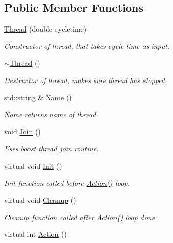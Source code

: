 \subsection*{Public Member Functions}
\begin{DoxyCompactItemize}
\item 
\hyperlink{classRCS_1_1Thread_a3f5e86f11c0b8fc3aa4728549b1b7249}{Thread} (double cycletime)
\begin{DoxyCompactList}\small\item\em Constructor of thread, that takes cycle time as input. \end{DoxyCompactList}\item 
\hyperlink{classRCS_1_1Thread_a7b91358afd5f9609b3a6b5b32f9a89aa}{$\sim$\-Thread} ()
\begin{DoxyCompactList}\small\item\em Destructor of thread, makes sure thread has stopped. \end{DoxyCompactList}\item 
std\-::string \& \hyperlink{classRCS_1_1Thread_a2db2a8e8dea3c4e502e8d6adbbf05724}{Name} ()
\begin{DoxyCompactList}\small\item\em Name returns name of thread. \end{DoxyCompactList}\item 
void \hyperlink{classRCS_1_1Thread_a5f7209d2edfa23588f6adc74bbfb8f07}{Join} ()
\begin{DoxyCompactList}\small\item\em Uses boost thread join routine. \end{DoxyCompactList}\item 
virtual void \hyperlink{classRCS_1_1Thread_a53ee19c04d064c9a23f0909cf9a4b2cc}{Init} ()
\begin{DoxyCompactList}\small\item\em Init function called before \hyperlink{classRCS_1_1Thread_a78aec7128f4fbf5d6859ceb09f9f9ae1}{Action()} loop. \end{DoxyCompactList}\item 
virtual void \hyperlink{classRCS_1_1Thread_a8b932e4130f18d9747407fe70a87332a}{Cleanup} ()
\begin{DoxyCompactList}\small\item\em Cleanup function called after \hyperlink{classRCS_1_1Thread_a78aec7128f4fbf5d6859ceb09f9f9ae1}{Action()} loop done. \end{DoxyCompactList}\item 
virtual int \hyperlink{classRCS_1_1Thread_a78aec7128f4fbf5d6859ceb09f9f9ae1}{Action} ()

\end{DoxyCompactItemize}
